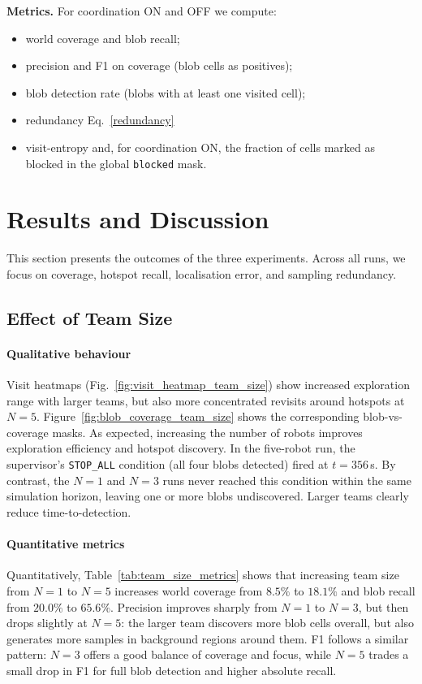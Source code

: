 \documentclass[lettersize,journal]{IEEEtran}
\begin{document}
\textbf{Metrics.}
For coordination ON and OFF we compute:
\begin{itemize}
    \item world coverage and blob recall;
    \item precision and F1 on coverage (blob cells as positives);
    \item blob detection rate (blobs with at least one visited cell);
    \item redundancy Eq.~\eqref{redundancy}
    \item visit-entropy and, for coordination ON, the fraction of cells marked
    as blocked in the global \texttt{blocked} mask.
\end{itemize}

\section{Results and Discussion }

This section presents the outcomes of the three experiments. Across all runs,
we focus on coverage, hotspot recall, localisation error, and sampling redundancy.

\subsection{Effect of Team Size}

\paragraph{Qualitative behaviour}
Visit heatmaps (Fig.~\ref{fig:visit_heatmap_team_size}) show increased exploration range with larger teams, but
also more concentrated revisits around hotspots at $N=5$. 
Figure~\ref{fig:blob_coverage_team_size} shows the corresponding blob-vs-coverage masks.
As expected, increasing the number of robots improves exploration efficiency and
hotspot discovery. In the five-robot run, the supervisor’s \texttt{STOP\_ALL}
condition (all four blobs detected) fired at $t=356$\,s. By contrast, the
$N=1$ and $N=3$ runs never reached this condition within the same simulation
horizon, leaving one or more blobs undiscovered. Larger teams clearly reduce
time-to-detection.

\paragraph{Quantitative metrics}
Quantitatively, Table~\ref{tab:team_size_metrics} shows that increasing team
size from $N=1$ to $N=5$ increases world coverage from $8.5\%$ to $18.1\%$ and
blob recall from $20.0\%$ to $65.6\%$. Precision improves sharply from
$N=1$ to $N=3$, but then drops slightly at $N=5$: the larger team discovers
more blob cells overall, but also generates more samples in background regions
around them. F1 follows a similar pattern: $N=3$ offers a good balance of
coverage and focus, while $N=5$ trades a small drop in F1 for full blob
detection and higher absolute recall.
\end{document}
